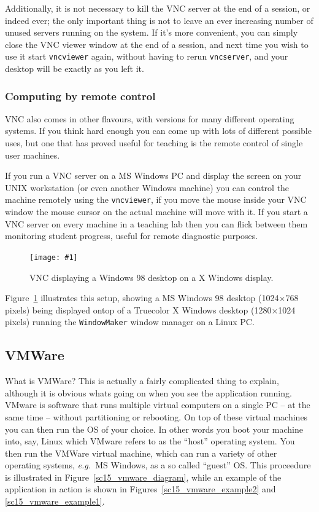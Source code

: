 \documentclass[twoside,11pt]{article}
\newcommand{\htmladdnormallink}[2]{#1}
\newcommand{\htmladdimg}[1]{}
\newcommand{\xlabel}[1]{}
\newcommand{\myfig} [5] {
  \begin{figure}
    \centering\texttt{[image: \#1]}
    \typeout{#1 inserted on page \arabic{page}}
    \caption{\label{#4}#5}
  \end{figure}
  }
\newcommand{\myfig}[5]{
    \label{#4} \htmladdimg{#3}\\
    Figure: #5\\
    }
\begin{document}
Additionally, it is not necessary to kill the VNC server at the end of a session, or indeed ever; the only important thing is not to leave an ever increasing number of unused servers running on the system. If it's more convenient, you can simply close the VNC viewer window at the end of a session, and next time you wish to use it start {\tt vncviewer} again, without having to rerun {\tt vncserver}, and your desktop will be exactly as you left it. 

\subsubsection{Computing by remote control}

\htmladdnormallink{VNC}{http://www.uk.research.att.com/vnc/} also comes in other flavours, with versions for many different operating systems. If you think hard enough you can come up with lots of different possible uses, but one that has proved useful for teaching is the remote control of single user machines. 

If you run a VNC server on a MS Windows PC and display the screen on your UNIX workstation (or even another Windows machine) you can control the machine remotely using the {\tt vncviewer}, if you move the mouse inside your VNC window the mouse cursor on the actual machine will move with it. If you start a VNC server on every machine in a teaching lab then you can flick between them monitoring student progress, useful for remote diagnostic purposes.

\myfig{sc15_vncwin.eps}{height=0.45\textheight}{sc15_vncwin.gif}{sc15_vnc_win}{VNC displaying a Windows 98 desktop on a X Windows display.}

Figure~\ref{sc15_vnc_win} illustrates this setup, showing a MS Windows 98 desktop (1024$\times$768 pixels) being displayed ontop of a Truecolor X Windows desktop (1280$\times$1024 pixels) running the {\tt WindowMaker} window manager on a Linux PC.

\subsection{\xlabel{sc15_vmware}VMWare\label{sc15_vmware}}

What is \htmladdnormallink{VMWare}{http://www.vmware.com/}? This is actually a fairly complicated thing to explain, although it is obvious whats going on when you see the application running. VMware is software that runs multiple virtual computers on a single PC -- at the same time -- without partitioning or rebooting. On top of these virtual machines you can then run the OS of your choice. In other words you boot your machine into, say, Linux which VMware refers to as the ``host'' operating system. You then run the VMWare virtual machine, which can run a variety of other operating systems, {\em e.g.\ }MS Windows, as a so called ``guest'' OS. This proceedure is illustrated in Figure~\ref{sc15_vmware_diagram}, while an example of the application in action is shown in Figures~\ref{sc15_vmware_example2} and \ref{sc15_vmware_example1}.
\end{document}
